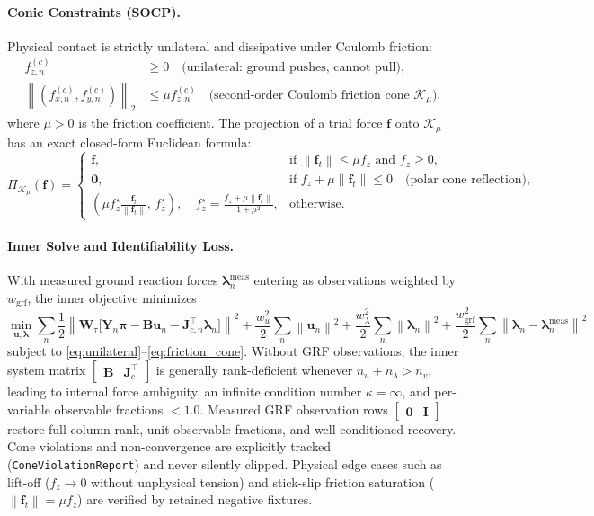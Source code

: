 \documentclass[11pt,a4paper]{article}
\newcommand{\bu}{\mathbf{u}}
\newcommand{\bY}{\mathbf{Y}}
\newcommand{\bB}{\mathbf{B}}
\newcommand{\bJ}{\mathbf{J}}
\newcommand{\bW}{\mathbf{W}}
\newcommand{\bpi}{\boldsymbol{\pi}}
\newcommand{\blambda}{\boldsymbol{\lambda}}
\newcommand{\norm}[1]{\left\lVert #1 \right\rVert}
\begin{document}
\paragraph{Conic Constraints (SOCP).}
Physical contact is strictly unilateral and dissipative under Coulomb friction:
\begin{align}
  f_{z,n}^{(c)} &\ge 0 \quad\text{(unilateral: ground pushes, cannot pull)}, \label{eq:unilateral}\\
  \norm{(f_{x,n}^{(c)}, f_{y,n}^{(c)})}_2 &\le \mu f_{z,n}^{(c)} \quad\text{(second-order Coulomb friction cone } \mathcal{K}_\mu \text{)}, \label{eq:friction_cone}
\end{align}
where $\mu>0$ is the friction coefficient.  The projection of a trial force $\mathbf{f}$ onto $\mathcal{K}_\mu$
has an exact closed-form Euclidean formula:
\begin{equation}
  \Pi_{\mathcal{K}_\mu}(\mathbf{f}) = \begin{cases}
    \mathbf{f}, & \text{if } \norm{\mathbf{f}_t}\le\mu f_z \text{ and } f_z\ge 0,\\
    \mathbf{0}, & \text{if } f_z + \mu\norm{\mathbf{f}_t} \le 0 \quad\text{(polar cone reflection)},\\
    \left(\mu f_z^\star \frac{\mathbf{f}_t}{\norm{\mathbf{f}_t}},\, f_z^\star\right),
    \quad f_z^\star = \frac{f_z+\mu\norm{\mathbf{f}_t}}{1+\mu^2}, & \text{otherwise}.
  \end{cases}
\end{equation}

\paragraph{Inner Solve and Identifiability Loss.}
With measured ground reaction forces $\blambda^{\mathrm{meas}}_n$ entering as observations
weighted by $w_{\mathrm{grf}}$, the inner objective minimizes
\begin{equation}
  \min_{\bu, \blambda} \sum_{n} \frac12\norm{\bW_\tau\big[\bY_n\bpi - \bB\bu_n - \bJ_{c,n}^{\!\top}\blambda_n\big]}^2
  + \frac{w_u^2}{2}\sum_n\norm{\bu_n}^2 + \frac{w_\lambda^2}{2}\sum_n\norm{\blambda_n}^2
  + \frac{w_{\mathrm{grf}}^2}{2}\sum_n\norm{\blambda_n - \blambda^{\mathrm{meas}}_n}^2
\end{equation}
subject to \eqref{eq:unilateral}--\eqref{eq:friction_cone}.  Without GRF observations,
the inner system matrix $\begin{bmatrix} \bB & \bJ_c^{\!\top} \end{bmatrix}$ is generally rank-deficient
whenever $n_u + n_\lambda > n_v$, leading to internal force ambiguity, an infinite condition number
$\kappa=\infty$, and per-variable observable fractions $<1.0$.  Measured GRF observation rows
$\begin{bmatrix}\mathbf{0} & \mathbf{I}\end{bmatrix}$ restore full column rank, unit observable fractions,
and well-conditioned recovery.  Cone violations and non-convergence are explicitly tracked
(\texttt{ConeViolationReport}) and never silently clipped.  Physical edge cases such as lift-off
($f_z\to 0$ without unphysical tension) and stick-slip friction saturation
($\norm{\mathbf{f}_t}=\mu f_z$) are verified by retained negative fixtures.
\end{document}
